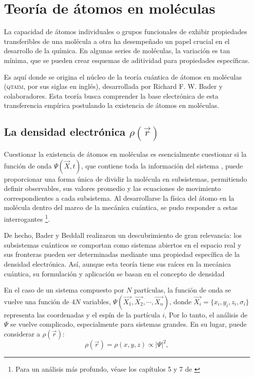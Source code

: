 
\section{Teoría de átomos en moléculas}
  La capacidad de átomos individuales o grupos funcionales de exhibir
  propiedades transferibles de una molécula a otra ha desempeñado un
  papel crucial en el desarrollo de la química. En algunas series de
  moléculas, la variación es tan mínima, que se pueden crear esquemas
  de aditividad para propiedades específicas.
  
  Es aquí donde se origina el núcleo de la teoría cuántica de átomos 
  en moléculas (\textsc{qtaim}, por sus siglas en inglés), desarrollada
  por Richard F. W. Bader y colaboradores. Esta teoría busca comprender
  la base electrónica de esta transferencia empírica postulando la 
  existencia de átomos en moléculas.
\subsection{La densidad electrónica $\rho(\vec{r})$}
  Cuestionar la existencia de átomos en moléculas es esencialmente
  cuestionar si la función de onda $\Psi(\vec{X},t)$, que contiene 
  toda la información del sistema \cite{cohen1}, puede proporcionar
  una forma única de dividir la molécula en subsistemas, permitiendo
  definir observables, sus valores promedio y las ecuaciones de
  movimiento correspondientes a cada subsistema. Al desarrollarse 
  la física del átomo en la molécula dentro del marco de la mecánica
  cuántica, se pudo responder a estas interrogantes \footnote{Para
  un análisis más profundo, véase los capítulos 5 y 7 de \cite{badero}}.
  
  De hecho, Bader y Beddall \cite{bader1972} realizaron un descubrimiento
  de gran relevancia: los subsistemas cuánticos se comportan como sistemas
  abiertos en el espacio real y sus fronteras pueden ser determinadas
  mediante una propiedad específica de la densidad electrónica. Así, 
  aunque esta teoría tiene sus raíces en la mecánica cuántica, su 
  formulación y aplicación se basan en el concepto de densidad

  En el caso de un sistema compuesto por $N$ partículas, la función
  de onda se vuelve una función de $4N$ variables, $\Psi(\vec{X_1},
  \vec{X_2},\cdots,\vec{X_n})$, donde $\vec{X_i} = \{ x_i,y_i,z_i,
  \sigma_i \}$ representa las coordenadas y el espín de la partícula
  $i$, Por lo tanto, el análisis de $\Psi$ se vuelve complicado,
  especialmente para sistemas grandes.
  En su lugar, puede considerar a $\rho(\vec{r})$:
  \begin{equation}
    \rho(\vec{r}) = \rho(x,y,z) \propto |\Psi|^2,
  \end{equation}
  		
